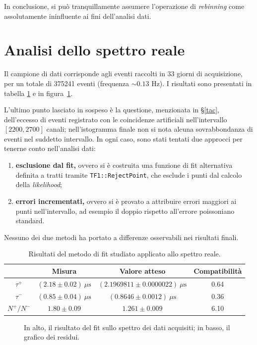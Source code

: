 \documentclass[10pt, oneside, a4paper]{article}   	%
\begin{document}
In conclusione, si può tranquillamente assumere l'operazione di \textit{rebinning} come assolutamente ininfluente ai fini dell'analisi dati.
%
\section{Analisi dello spettro reale} \label{analisireale}
Il campione di dati corrisponde agli eventi raccolti in 33 giorni di acquisizione, per un totale di 375241 eventi (frequenza $\sim0.13$ Hz). I risultati sono presentati in tabella \ref{risultatiFinali} e in figura~\ref{fig:finale}.

L'ultimo punto lasciato in sospeso è la questione, menzionata in \S\ref{tac}, dell'eccesso di eventi registrato con le coincidenze artificiali nell'intervallo $[2200,2700]$ canali; nell'istogramma finale non si nota alcuna sovrabbondanza di eventi nel suddetto intervallo. In ogni caso, sono stati tentati due approcci per tenerne conto nell'analisi dati:
\begin{enumerate}
  \item \textbf{esclusione dal fit,} ovvero si è costruita una funzione di fit alternativa definita a tratti tramite \lstinline{TF1::RejectPoint}, che esclude i punti dal calcolo della \textit{likelihood};
  \item \textbf{errori incrementati,} ovvero si è provato a attribuire errori maggiori ai punti nell'intervallo, ad esempio il doppio rispetto all'errore poissoniano standard.
\end{enumerate}
Nessuno dei due metodi ha portato a differenze osservabili nei risultati finali.
%
\begin{table}[H]
	\centering
	\begin{tabular}{cccc}
		\toprule
				& Misura	& Valore atteso 	& Compatibilità \\	
		\midrule
		$\tau^+$	& $(2.18 \pm 0.02) \ \mu \mbox{s}$ 	& $(2.1969811 \pm 0.0000022) \  \mu \mbox{s}$ 	& 0.64 	\\
		$\tau^-$	& $(0.85 \pm 0.04)  \ \mu \mbox{s}$ 	& $(0.8646 \pm 0.0012)  \ \mu \mbox{s}$ 		& 0.36	\\
		$N^+/N^-$	& $1.80 \pm 0.09$ 	& $1.261 \pm 0.009$ 		& 6.10	\\
		\bottomrule
	\end{tabular}
	\caption{Risultati del metodo di fit studiato applicato allo spettro reale.}
	\label{risultatiFinali}
\end{table}
%
\begin{figure}[H]
 \centerline{%
  }
  \caption{In alto, il risultato del fit sullo spettro dei dati acquisiti; in basso, il grafico dei residui.}
  \label{fig:finale}
\end{figure}
%
\end{document}
